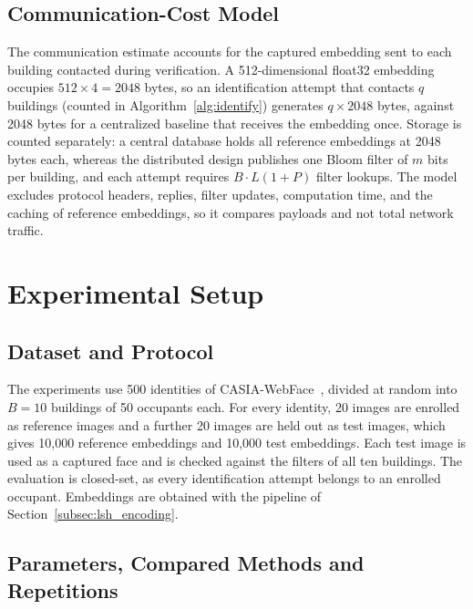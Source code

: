 \documentclass[pdflatex,sn-mathphys-num]{sn-jnl}%
\theoremstyle{thmstyleone}%
\theoremstyle{thmstyletwo}%
\theoremstyle{thmstylethree}%
\begin{document}
\subsection{Communication-Cost Model}
\label{subsec:communication_cost}

The communication estimate accounts for the captured embedding sent to each building contacted during verification. A 512-dimensional float32 embedding occupies $512\times4=2048$ bytes, so an identification attempt that contacts $q$ buildings (counted in Algorithm~\ref{alg:identify}) generates $q\times2048$ bytes, against 2048 bytes for a centralized baseline that receives the embedding once. Storage is counted separately: a central database holds all reference embeddings at 2048 bytes each, whereas the distributed design publishes one Bloom filter of $m$ bits per building, and each attempt requires $B\cdot L(1+P)$ filter lookups. The model excludes protocol headers, replies, filter updates, computation time, and the caching of reference embeddings, so it compares payloads and not total network traffic.


\section{Experimental Setup}
\label{sec:setup}

\subsection{Dataset and Protocol}

The experiments use 500 identities of CASIA-WebFace~\cite{yi2014}, divided at random into $B=10$ buildings of 50 occupants each. For every identity, 20 images are enrolled as reference images and a further 20 images are held out as test images, which gives 10,000 reference embeddings and 10,000 test embeddings. Each test image is used as a captured face and is checked against the filters of all ten buildings. The evaluation is closed-set, as every identification attempt belongs to an enrolled occupant. Embeddings are obtained with the pipeline of Section~\ref{subsec:lsh_encoding}.

\subsection{Parameters, Compared Methods and Repetitions}
\end{document}
